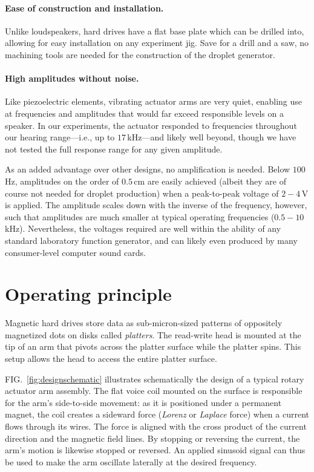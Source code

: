 \documentclass[aip,rsi,reprint,graphicx]{revtex4-1} %
\begin{document}
\paragraph*{Ease of construction and installation.} Unlike loudspeakers, hard
drives have a flat base plate which can be drilled into, allowing for easy
installation on any experiment jig. Save for a drill and a saw, no machining
tools are needed for the construction of the droplet generator.

\paragraph*{High amplitudes without noise.}
Like piezoelectric elements, vibrating actuator arms are very quiet, enabling
use at frequencies and amplitudes that would far exceed responsible levels on
a speaker.  In our experiments, the actuator responded to frequencies throughout
our hearing range---i.e., up to $17\,$kHz---and likely well beyond, though we
have not tested the full response range for any given amplitude.

As an added advantage over other designs, no amplification is needed. Below
$100\,$Hz, amplitudes on the order of $0.5\,$cm are easily achieved (albeit they
are of course not needed for droplet production) when a peak-to-peak voltage of
$2-4\,$V is applied. The amplitude scales down with the inverse of the frequency,
however, such that amplitudes are much smaller at typical operating frequencies
($0.5-10\,$kHz). Nevertheless, the voltages required are well within the ability
of any standard laboratory function generator, and can likely even produced by many
consumer-level computer sound cards.

\section{Operating principle}
Magnetic hard drives store data as sub-micron-sized patterns of 
oppositely magnetized dots on disks called \emph{platters}. The read-write head
is mounted at the tip of an arm that pivots across the platter surface while the
platter spins. This setup allows the head to access the entire platter surface.

FIG.~\ref{fig:designschematic} illustrates schematically the design of a typical
rotary actuator arm assembly. The flat voice coil mounted on the surface is responsible
for the arm's side-to-side movement: as it is positioned under a permanent
magnet, the coil creates a sideward force (\emph{Lorenz} or \emph{Laplace}
force) when a current flows through its wires. The force is aligned with the
cross product of the current direction and the magnetic field lines. By stopping
or reversing the current, the arm's motion is likewise stopped or reversed. An
applied sinusoid signal can thus be used to make the arm oscillate laterally at
the desired frequency.
\end{document}

